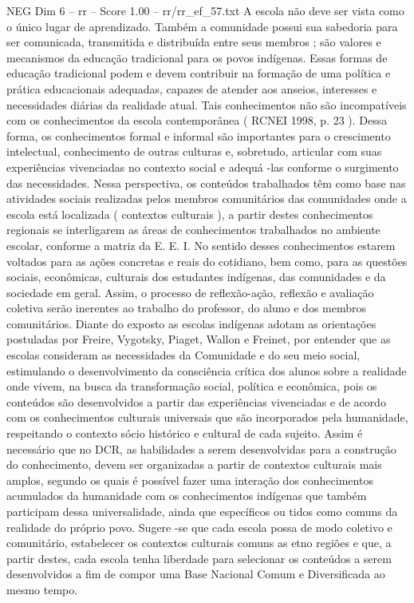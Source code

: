 \begin{textsample}{NEG Dim 6 – rr – Score 1.00 – rr/rr\_ef\_57.txt}
A escola não deve ser vista como o único lugar de aprendizado.
Também a comunidade possui sua sabedoria para ser comunicada, transmitida e distribuída entre seus membros ; são valores e mecanismos da educação tradicional para os povos indígenas.
Essas formas de educação tradicional podem e devem contribuir na formação de uma política e prática educacionais adequadas, capazes de atender aos anseios, interesses e necessidades diárias da realidade atual.
Tais conhecimentos não são incompatíveis com os conhecimentos da escola contemporânea ( RCNEI 1998, p. 23 ).
Dessa forma, os conhecimentos formal e informal são importantes para o crescimento intelectual, conhecimento de outras culturas e, sobretudo, articular com suas experiências vivenciadas no contexto social e adequá -las conforme o surgimento das necessidades.
Nessa perspectiva, os conteúdos trabalhados têm como base nas atividades sociais realizadas pelos membros comunitários das comunidades onde a escola está localizada ( contextos culturais ), a partir destes conhecimentos regionais se interligarem as áreas de conhecimentos trabalhados no ambiente escolar, conforme a matriz da E.
E.
I.
No sentido desses conhecimentos estarem voltados para as ações concretas e reais do cotidiano, bem como, para as questões sociais, econômicas, culturais dos estudantes indígenas, das comunidades e da sociedade em geral.
Assim, o processo de reflexão-ação, reflexão e avaliação coletiva serão inerentes ao trabalho do professor, do aluno e dos membros comunitários.
Diante do exposto as escolas indígenas adotam as orientações postuladas por Freire, Vygotsky, Piaget, Wallon e Freinet, por entender que as escolas consideram as necessidades da Comunidade e do seu meio social, estimulando o desenvolvimento da consciência crítica dos alunos sobre a realidade onde vivem, na busca da transformação social, política e econômica, pois os conteúdos são desenvolvidos a partir das experiências vivenciadas e de acordo com os conhecimentos culturais universais que são incorporados pela humanidade, respeitando o contexto sócio histórico e cultural de cada sujeito.
Assim é necessário que no DCR, as habilidades a serem desenvolvidas para a construção do conhecimento, devem ser organizadas a partir de contextos culturais mais amplos, segundo os quais é possível fazer uma interação dos conhecimentos acumulados da humanidade com os conhecimentos indígenas que também participam dessa universalidade, ainda que específicos ou tidos como comuns da realidade do próprio povo.
Sugere -se que cada escola possa de modo coletivo e comunitário, estabelecer os contextos culturais comuns as etno regiões e que, a partir destes, cada escola tenha liberdade para selecionar os conteúdos a serem desenvolvidos a fim de compor uma Base Nacional Comum e Diversificada ao mesmo tempo.

\end{textsample}
